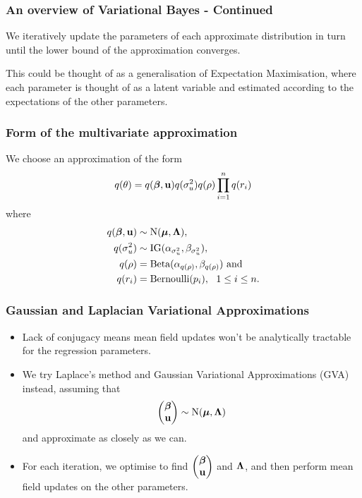 \documentclass{beamer}
\begin{document}
\begin{frame}
	\frametitle{An overview of Variational Bayes - Continued}
	We iteratively update the parameters of each approximate distribution
	in turn until the lower bound of the approximation converges.
			
	\bigskip 
	This could be thought of as a generalisation of Expectation Maximisation, where each parameter is thought of as a latent
	variable and estimated according to the expectations of the other parameters.
\end{frame}


\begin{frame}
	\frametitle{Form of the multivariate approximation}
	We choose an approximation of the form
	$$
	q(\theta) = q({\boldsymbol \beta}, {\bf u}) q(\sigma_u^2) q(\rho) \prod_{i=1}^n q(r_i)
	$$
	where
	\begin{align*}
		q({\boldsymbol \beta}, {\bf u}) & \sim \text{N}({\boldsymbol \mu}, {\boldsymbol \Lambda}),                               \\
		q(\sigma_u^2)  & \sim \text{IG}(\alpha_{\sigma_u^2}, \beta_{\sigma_u^2}),     \\
		q(\rho)        & = \text{Beta}(\alpha_{q(\rho)}, \beta_{q(\rho)}) \text{ and} \\
		q(r_i)         & = \text{Bernoulli}(p_i), \ \ 1 \leq i \leq n.                
	\end{align*}
\end{frame}

\begin{frame}
	\frametitle{Gaussian and Laplacian Variational Approximations}
	\begin{itemize}
		\item Lack of conjugacy means mean field updates won't be analytically tractable for the regression parameters.
		\item We try Laplace's method and Gaussian Variational Approximations (GVA) instead, assuming that
		      $$
		      \begin{pmatrix}
		      	{\boldsymbol\beta} \\
		      	{\bf u}    
		      \end{pmatrix}
		      \sim \text{N}({\boldsymbol \mu}, {\boldsymbol \Lambda})
		      $$
		      and approximate as closely as we can.
		\item For each iteration, we optimise to find
		      $\begin{pmatrix}
		      	{\boldsymbol\beta} \\
		      	{\bf u}    
		      \end{pmatrix}
		      $ and ${\boldsymbol \Lambda}$,
		      and then perform mean field updates on the other parameters.
	\end{itemize}
\end{frame}
\end{document}
